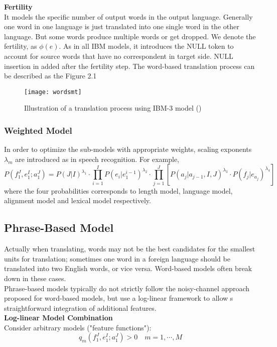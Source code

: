 \textbf{Fertility} \\
It models the specific number of output words in the output language. Generally one word in one language is just translated into one single word in the other language. But some words produce multiple words or get dropped. We denote the fertility, as $\phi(e)$.  As in all IBM models, it introduces the NULL token to account for source words that have no correspondent in target side. NULL insertion in added after the fertility step. The word-based translation process can be described as the Figure 2.1 \cite{koehn2009statistical}
\begin{figure}[t]
	\centering
	\texttt{[image: wordsmt]}
	\caption{ Illustration of a translation process using IBM-3 model (\cite{koehn2009statistical})}

\end{figure}




\subsubsection{Weighted Model}
 In order to optimize the sub-models with appropriate weights, scaling exponents ${\lambda_{m}}$ are introduced as in speech recognition. For example,
\[ P(f_1^J, e_1^I; a_1^J) = P(J|I)^{\lambda_1} \cdot \prod_{i=1}^{I} P(e_i|e_1^{i-1})^{\lambda_2} \cdot \prod_{j=1}^{J} [P(a_j|a_{j-1}, I, J)^{\lambda_{3}} \cdot P(f_j|e_{a_j})^{\lambda_4}]  \]
where the four probabilities corresponds to length model, language model, alignment model and lexical model respectively. 


\subsection{Phrase-Based Model}
Actually when translating, words may not be the best candidates for the smallest units for translation; sometimes one word in a foreign language should be translated into two English words, or vice versa. Word-based models often break down in these cases.\\
Phrase-based models typically do not strictly follow the noisy-channel approach proposed for word-based models, but use a log-linear framework to allow s straightforward integration of additional features.\\

\textbf{Log-linear Model Combination}\\
Consider arbitrary models ("feature functions"):
\[ q_m(f_1^J, e_1^I; a_1^J) > 0  \quad m = 1, \cdots, M\]

